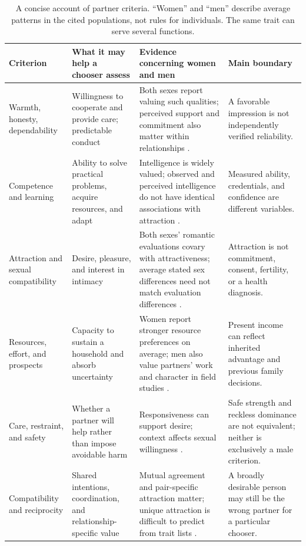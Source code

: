 \documentclass[10pt,twocolumn,letterpaper]{article}
\begin{document}
\begin{table}[t]
\caption{A concise account of partner criteria. ``Women'' and ``men'' describe average patterns in the cited populations, not rules for individuals. The same trait can serve several functions.}
\label{tab:criteria}
\small\begin{tabularx}{\textwidth}{L{.16\textwidth}Y Y Y}
\toprule
Criterion & What it may help a chooser assess & Evidence concerning women and men & Main boundary\\
\midrule
Warmth, honesty, dependability & Willingness to cooperate and provide care; predictable conduct & Both sexes report valuing such qualities; perceived support and commitment also matter within relationships \citep{li2002,joel2020}. & A favorable impression is not independently verified reliability.\\
Competence and learning & Ability to solve practical problems, acquire resources, and adapt & Intelligence is widely valued; observed and perceived intelligence do not have identical associations with attraction \citep{walter2020,driebe2021}. & Measured ability, credentials, and confidence are different variables.\\
Attraction and sexual compatibility & Desire, pleasure, and interest in intimacy & Both sexes' romantic evaluations covary with attractiveness; average stated sex differences need not match evaluation differences \citep{eastwick2014}. & Attraction is not commitment, consent, fertility, or a health diagnosis.\\
Resources, effort, and prospects & Capacity to sustain a household and absorb uncertainty & Women report stronger resource preferences on average; men also value partners' work and character in field studies \citep{walter2020,marlowe,pillsworth}. & Present income can reflect inherited advantage and previous family decisions.\\
Care, restraint, and safety & Whether a partner will help rather than impose avoidable harm & Responsiveness can support desire; context affects sexual willingness \citep{birnbaum,conley2014}. & Safe strength and reckless dominance are not equivalent; neither is exclusively a male criterion.\\
Compatibility and reciprocity & Shared intentions, coordination, and relationship-specific value & Mutual agreement and pair-specific attraction matter; unique attraction is difficult to predict from trait lists \citep{joel2017,jonason2026}. & A broadly desirable person may still be the wrong partner for a particular chooser.\\
\bottomrule
\end{tabularx}
\end{table}
\end{document}
